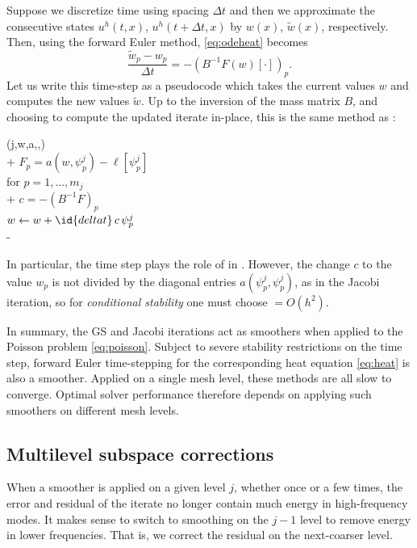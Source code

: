 \documentclass[letterpaper,final,12pt,reqno]{amsart}
\theoremstyle{claim}
\numberwithin{equation}{section}
\numberwithin{figure}{section}
\numberwithin{table}{section}
\numberwithin{theorem}{section}
\begin{document}
Suppose we discretize time using spacing $\Delta t$ and then we approximate the consecutive states $u^h(t,x)$, $u^h(t+\Delta t,x)$ by $w(x)$, $\tilde w(x)$, respectively.  Then, using the forward Euler method, \eqref{eq:odeheat} becomes
\begin{equation}
\frac{\tilde w_p - w_p}{\Delta t} = - (B^{-1} F(w)[\cdot])_p. \label{eq:forwardeulerheat}
\end{equation}
Let us write this time-step as a pseudocode which takes the current values $w$ and computes the new values $\tilde w$.  Up to the inversion of the mass matrix $B$, and choosing to compute the updated iterate in-place, this is the same method as :
\begin{pseudo*} \label{ps:euler-timestep}
(j,w,a,\ell,)\text{:} \\+
    $F_p = a(w,\psi_p^j) - \ell[\psi_p^j]$ \\
    for $p=1,\dots,m_j$ \\+
        $\displaystyle c = - (B^{-1} F)_p$  \\
        $w \gets w + \id{deltat}\, c\, \psi_p^j$ \\-
\end{pseudo*}
In particular, the time step  plays the role of  in .  However, the change $c$ to the value $w_p$ is not divided by the diagonal entries $a(\psi_p^j,\psi_p^j)$, as in the Jacobi iteration, so for \emph{conditional stability} \cite{Bueler2021} one must choose  $=O(h^2)$.

In summary, the GS and Jacobi iterations act as smoothers when applied to the Poisson problem \eqref{eq:poisson}.  Subject to severe stability restrictions on the time step, forward Euler time-stepping for the corresponding heat equation \eqref{eq:heat} is also a smoother.  Applied on a single mesh level, these methods are all slow to converge.  Optimal solver performance therefore depends on applying such smoothers on different mesh levels.

\subsection{Multilevel subspace corrections} \label{subsec:msc}  When a smoother is applied on a given level $j$, whether once or a few times, the error and residual of the iterate no longer contain much energy in high-frequency modes.  It makes sense to switch to smoothing on the $j-1$ level to remove energy in lower frequencies.  That is, we correct the residual on the next-coarser level.
\end{document}
